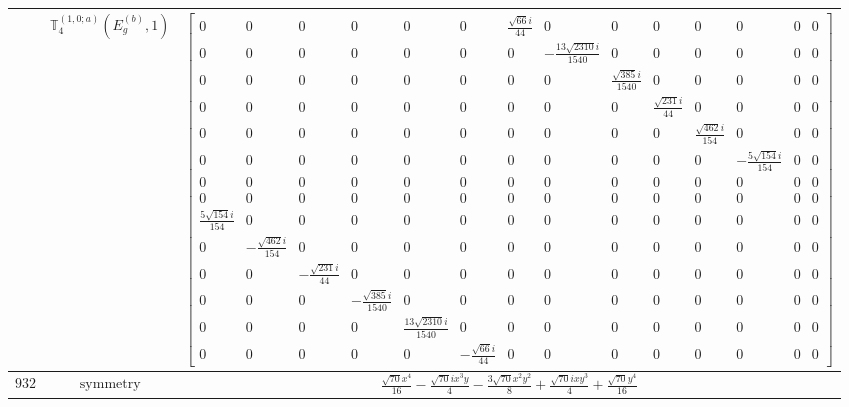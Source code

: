 \documentclass[fleqn,8pt,landscape]{jsarticle}
\begin{document}
\begin{longtable}{ccc}
$  $ & $ \mathbb{T}_{4}^{(1,0;a)}(E_{g}^{(b)},1) $ & $ \begin{bmatrix} 0 & 0 & 0 & 0 & 0 & 0 & \frac{\sqrt{66} i}{44} & 0 & 0 & 0 & 0 & 0 & 0 & 0 \\ 0 & 0 & 0 & 0 & 0 & 0 & 0 & - \frac{13 \sqrt{2310} i}{1540} & 0 & 0 & 0 & 0 & 0 & 0 \\ 0 & 0 & 0 & 0 & 0 & 0 & 0 & 0 & \frac{\sqrt{385} i}{1540} & 0 & 0 & 0 & 0 & 0 \\ 0 & 0 & 0 & 0 & 0 & 0 & 0 & 0 & 0 & \frac{\sqrt{231} i}{44} & 0 & 0 & 0 & 0 \\ 0 & 0 & 0 & 0 & 0 & 0 & 0 & 0 & 0 & 0 & \frac{\sqrt{462} i}{154} & 0 & 0 & 0 \\ 0 & 0 & 0 & 0 & 0 & 0 & 0 & 0 & 0 & 0 & 0 & - \frac{5 \sqrt{154} i}{154} & 0 & 0 \\ 0 & 0 & 0 & 0 & 0 & 0 & 0 & 0 & 0 & 0 & 0 & 0 & 0 & 0 \\ 0 & 0 & 0 & 0 & 0 & 0 & 0 & 0 & 0 & 0 & 0 & 0 & 0 & 0 \\ \frac{5 \sqrt{154} i}{154} & 0 & 0 & 0 & 0 & 0 & 0 & 0 & 0 & 0 & 0 & 0 & 0 & 0 \\ 0 & - \frac{\sqrt{462} i}{154} & 0 & 0 & 0 & 0 & 0 & 0 & 0 & 0 & 0 & 0 & 0 & 0 \\ 0 & 0 & - \frac{\sqrt{231} i}{44} & 0 & 0 & 0 & 0 & 0 & 0 & 0 & 0 & 0 & 0 & 0 \\ 0 & 0 & 0 & - \frac{\sqrt{385} i}{1540} & 0 & 0 & 0 & 0 & 0 & 0 & 0 & 0 & 0 & 0 \\ 0 & 0 & 0 & 0 & \frac{13 \sqrt{2310} i}{1540} & 0 & 0 & 0 & 0 & 0 & 0 & 0 & 0 & 0 \\ 0 & 0 & 0 & 0 & 0 & - \frac{\sqrt{66} i}{44} & 0 & 0 & 0 & 0 & 0 & 0 & 0 & 0 \end{bmatrix} $ \\ \hline
$ 932 $ & $ \text{symmetry} $ & $ \frac{\sqrt{70} x^{4}}{16} - \frac{\sqrt{70} i x^{3} y}{4} - \frac{3 \sqrt{70} x^{2} y^{2}}{8} + \frac{\sqrt{70} i x y^{3}}{4} + \frac{\sqrt{70} y^{4}}{16} $ \\

\end{longtable}
\end{document}
